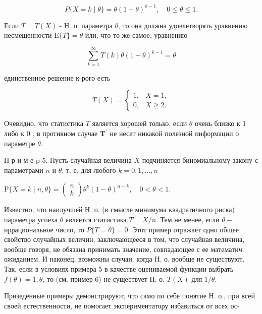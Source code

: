 \documentclass[10pt]{article}
\begin{document}
\[

P\{X=k \mid \theta\}=\theta(1-\theta)^{k-1}, \quad 0 \leqslant \theta \leqslant 1 .

\]



Если $T=T(X)$ - Н. о. параметра $\theta$, то она должна удовлетворять уравнению несмещенности $\mathrm{E}\{T\}=\theta$ или, что то же самое, уравнению



\[

\sum_{k=1}^{\infty} T(k) \theta(1-\theta)^{k-1}=\theta

\]



единственное решение к-рого есть



\[

T(X)= \begin{cases}1, & X=1, \\ 0, & X \geqslant 2 .\end{cases}

\]



Очевидно, что статистика $T$ является хорошей только, если $\theta$ очень близко к 1 либо к 0 , в противном случае $\boldsymbol{T}^{\prime}$ не несет никакой полезной пнформации о параметре $\theta$.



П р и м е $\mathrm{p}$ 5. Пусть случайная величина $X$ подчиняется биномиальному закону с параметрами $n$ и $\theta$, т. е. для любого $k=0,1, \ldots, n$



$\mathrm{P}\{X=k \mid n, \theta\}=\left(\begin{array}{l}n \\ k\end{array}\right) \theta^{k}(1-\theta)^{n-k}, \quad 0<\theta<1$.



Известно, что наилучшей Н. о. (в смысле минимума квадратичного риска) параметра успеха $\theta$ является статистика $T=X / n$. Тем не менее, если $\theta-$ иррациональное число, то $P\{T=\theta\}=0$. Этот пример отражает одно общее свойство случайных величин, заключающееся в том, что случайная величина, вообще говоря, не обязана принимать значение, совпадающее с ее математич. ожиданием. И наконец, возможны случаи, когда Н. о. вообще не существуют. Так, если в условиях примера 5 в качестве оцениваемой функции выбрать $f(\theta)=1, \theta$, то (см. пример 6) не существует Н. о. $T(X)$ для $1 / \theta$.



Призеденные примеры демонстрируют, что само по себе понятие Н. о., при всей своей естественности, не помогает экспериментатору избавиться от всех ос-
\end{document}
